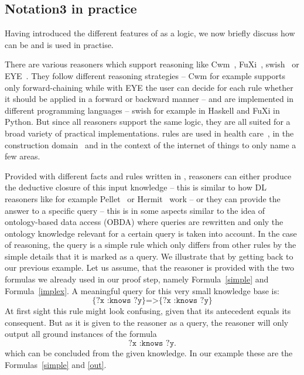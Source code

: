 



\subsection{Notation3 in practice}\label{prn3}
\sloppy
Having introduced the different features of \nthree as a logic, we now briefly discuss how \nthree can be and is used in practise. 
% 

There are various reasoners which support \nthree reasoning like Cwm~\cite{cwm}, FuXi~\cite{fuxi}, swish~\cite{swish} or EYE~\cite{eye}. They follow different reasoning strategies
--
Cwm for example supports only  forward-chaining while with EYE the user can decide for each rule whether it should be applied in a forward or backward manner -- and are implemented 
in different programming languages -- swish for example in Haskell and FuXi in Python. But since all reasoners support the same logic, they are all suited for 
a broad variety of practical 
implementations. \nthree rules are used in health care~\cite{sun,dou}, in the construction domain~\cite{bau} and in the context of the internet of things \cite{iot} 
to only name a few areas.

Provided with different facts and rules written in \nthree, reasoners can either produce the deductive closure of this input knowledge -- this is similar to how \owl DL reasoners
like for example 
Pellet~\cite{Pellet} or Hermit~\cite{hermit} work -- or they can provide the answer to a specific query -- this is in some aspects similar to the idea of 
ontology-based data access (OBDA) \cite{obda} where queries are rewritten and only the ontology knowledge relevant for a certain query is taken into account. 
In the case of \nthree reasoning, the query is a simple \nthree rule which only differs from other rules by the simple details that it is marked as a query. We illustrate that by getting back to our previous example.
Let us assume, that the reasoner is provided with the two formulas we already used in our proof step, namely Formula~\ref{simple} and Formula~\ref{implex}. A meaningful query for this very small knowledge base is:
\begin{equation}
 \texttt{\{?x :knows ?y\}=>\{?x :knows ?y\}}
\end{equation}
At first sight this rule might look confusing, given that its antecedent equals its consequent. But as it is given to the reasoner as a query, the reasoner will only output all ground instances of the 
formula 
\[
 \texttt{?x :knows ?y.}
\]
which can be concluded from the given knowledge. In our example these are the Formulas~\ref{simple} and \ref{out}. 


